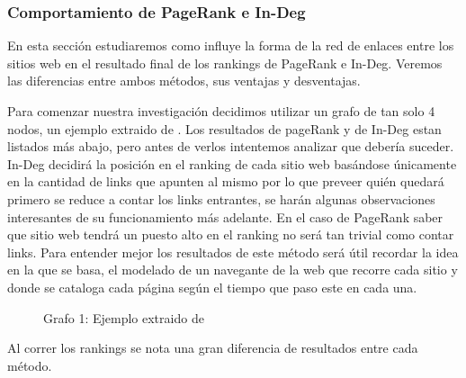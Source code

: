 
\subsubsection{Comportamiento de PageRank e In-Deg}

En esta sección estudiaremos como influye la forma de la red de enlaces entre los sitios web en el resultado final de los rankings de PageRank e In-Deg. Veremos las diferencias entre ambos métodos, sus ventajas y desventajas.

Para comenzar nuestra investigación decidimos utilizar un grafo de tan solo 4 nodos, un ejemplo extraido de \cite{Bryan2006}. Los resultados de pageRank y de In-Deg estan listados más abajo, pero antes de verlos intentemos analizar que debería suceder. In-Deg decidirá la posición en el ranking de cada sitio web basándose únicamente en la cantidad de links que apunten al mismo por lo que preveer quién quedará primero se reduce a contar los links entrantes, se harán algunas observaciones interesantes de su funcionamiento más adelante. En el caso de PageRank saber que sitio web tendrá un puesto alto en el ranking no será tan trivial como contar links. Para entender mejor los resultados de este método será útil recordar la idea en la que se basa, el modelado de un navegante de la web que recorre cada sitio y donde se cataloga cada página según el tiempo que paso este en cada una.

\begin{figure}[H]
\centering
{}
  \caption{\footnotesize{ Grafo 1: Ejemplo extraido de \cite{Bryan2006} }}
  \label{fig:Rankings}
\end{figure}

Al correr los rankings se nota una gran diferencia de resultados entre cada método.

